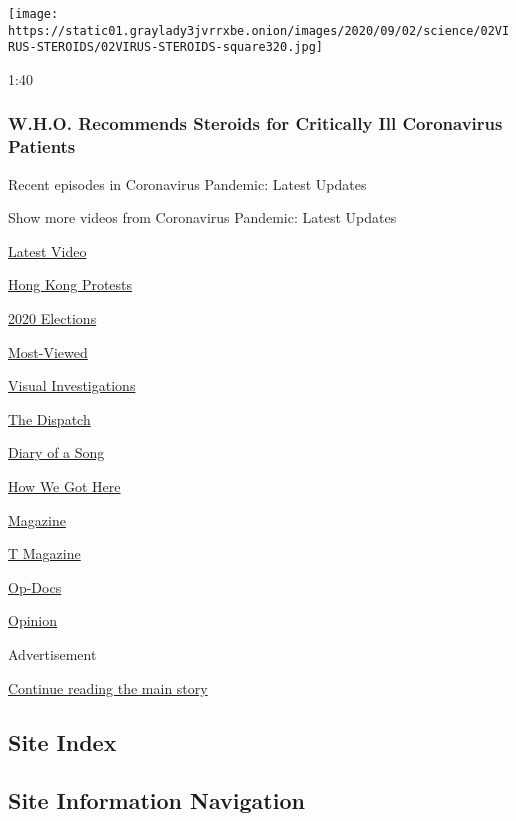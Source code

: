 \begin{itemize}
  \texttt{[image: https://static01.graylady3jvrrxbe.onion/images/2020/09/02/science/02VIRUS-STEROIDS/02VIRUS-STEROIDS-square320.jpg]}

  1:40

  \hypertarget{who-recommends-steroids-for-critically-ill-coronavirus-patients}{%
  \subsubsection{W.H.O. Recommends Steroids for Critically Ill
  Coronavirus
  Patients}\label{who-recommends-steroids-for-critically-ill-coronavirus-patients}}
\end{itemize}

Recent episodes in Coronavirus Pandemic: Latest Updates

Show more videos from Coronavirus Pandemic: Latest Updates

\href{/video}{}

\href{/video/latest-video}{Latest Video}

\href{/video/hk-protest}{Hong Kong Protests}

\href{/video/2020-Elections}{2020 Elections}

\href{/video/Most-Viewed}{Most-Viewed}

\href{/video/investigations}{Visual Investigations}

\href{/video/on-the-ground}{The Dispatch}

\href{/video/diaryofasong}{Diary of a Song}

\href{/video/how-we-got-here}{How We Got Here}

\href{/video/magazine}{Magazine}

\href{/video/t-magazine}{T Magazine}

\href{/video/op-docs}{Op-Docs}

\href{/video/opinion}{Opinion}

Advertisement

\protect\hyperlink{after-bottom}{Continue reading the main story}

\hypertarget{site-index}{%
\subsection{Site Index}\label{site-index}}

\hypertarget{site-information-navigation}{%
\subsection{Site Information
Navigation}\label{site-information-navigation}}

